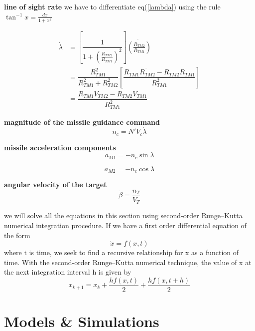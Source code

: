 \textbf{line of sight rate} we have to differentiate eq(\ref{lambda}) using the rule $\tan^{-1}x = \frac{dx}{1+x^2}$ 

\begin{equation}
	\begin{split}
	\dot{\lambda} &= [\dfrac{1}{1+(\frac{R_{TM2}}{R_{TM1}})^2}] \dot{(\frac{R_{TM2}}{R_{TM1}})}\\
	&= \dfrac{R_{TM1}^2}{R_{TM1}^2 + R_{TM2}^2}[\dfrac{R_{TM1}\dot{R_{TM2}}- R_{TM2} \dot{R_{TM1}}}{R_{TM1}^2}]\\
	&=\dfrac{R_{TM1} V_{TM2} - R_{TM2} V_{TM1}}{R_{TM1}^2}
	\end{split}
\end{equation}

\textbf{magnitude of the missile guidance command}
\begin{equation}
		n_c= N' V_c \dot{\lambda}
\end{equation}

\textbf{missile acceleration components}
\begin{equation}
	a_{M1} = - n_c \sin \lambda
\end{equation}

\begin{equation}
a_{M2} = - n_c \cos \lambda
\end{equation}

\textbf{angular velocity of the target}
\begin{equation}
	\dot{\beta} = \dfrac{n_T}{V_T}
\end{equation}

we will solve all the equations in this section using second-order Runge–Kutta numerical integration procedure. If we have a first order differential equation of the form 
\begin{equation*}
	\dot{x} = f(x,t) 
\end{equation*} 
 where t is time, we seek to find a recursive relationship for x as a function of time.
 With the second-order Runge–Kutta numerical technique, the value of x at the
 next integration interval h is given by
 \begin{equation*}
 	x_{k+1} = x_k + \dfrac{hf(x,t)}{2} + \dfrac{h f(x, t+h)}{2}
 \end{equation*}
\section{Models \& Simulations}

